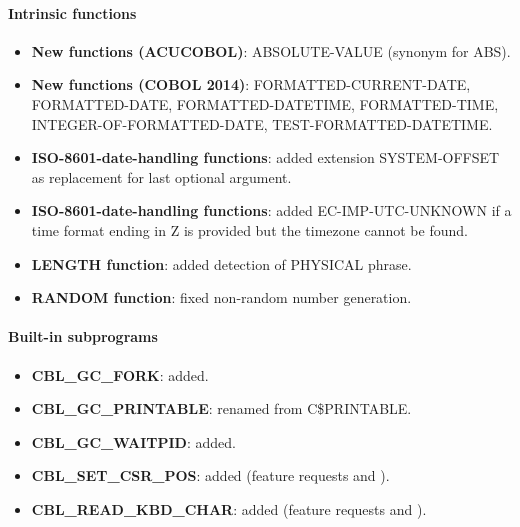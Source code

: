 \paragraph{Intrinsic functions}
\begin{itemize}
\item \textbf{New functions (ACUCOBOL)}: ABSOLUTE-VALUE (synonym for ABS).
\item \textbf{New functions (COBOL 2014)}: FORMATTED-CURRENT-DATE, FORMATTED-DATE, FORMATTED-DATETIME, FORMATTED-TIME, INTEGER-OF-FORMATTED-DATE, TEST-FORMATTED-DATETIME.
\item \textbf{ISO-8601-date-handling functions}: added extension SYSTEM-OFFSET as replacement for last optional argument.
\item \textbf{ISO-8601-date-handling functions}: added EC-IMP-UTC-UNKNOWN if a time format ending in Z is provided but the timezone cannot be found.
\item \textbf{LENGTH function}: added detection of PHYSICAL phrase.
\item \textbf{RANDOM function}: fixed non-random number generation.
\end{itemize}

\paragraph{Built-in subprograms}
\begin{itemize}
\item \textbf{CBL\_GC\_FORK}: added.
\item \textbf{CBL\_GC\_PRINTABLE}: renamed from C\$PRINTABLE.
\item \textbf{CBL\_GC\_WAITPID}: added.
\item \textbf{CBL\_SET\_CSR\_POS}: added (feature requests  and ).
\item \textbf{CBL\_READ\_KBD\_CHAR}: added (feature requests  and ).
\end{itemize}


